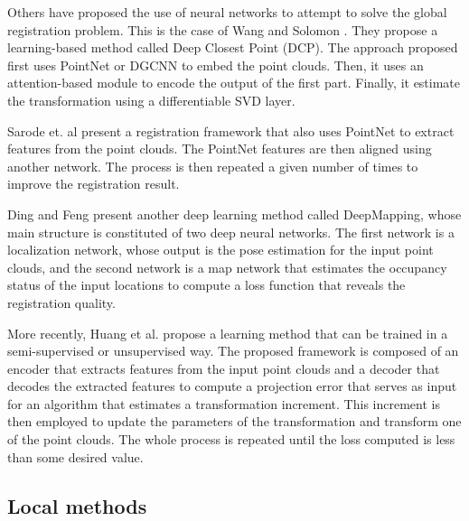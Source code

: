         Others have proposed the use of neural networks to attempt to solve the global registration problem.
        This is the case of Wang and Solomon \cite{Wang_2019_deepclosest}. They propose a learning-based method called Deep Closest Point (DCP).
        The approach proposed first uses PointNet \cite{Qi_2017_pointnetdeep} or DGCNN \cite{Wang_2019_dynamic} to embed the point clouds.
        Then, it uses an attention-based module to encode the output of the first part.
        Finally, it estimate the transformation using a differentiable SVD layer.

        Sarode et. al \cite{Sarode_2019_oneframework} present a registration framework that also uses PointNet to extract features from the point clouds.
        The PointNet features are then aligned using another network. The process is then repeated a given number of times to improve the registration result.
        
        Ding and Feng \cite{Ding_2019_deepmapping} present another deep learning method called DeepMapping,
        whose main structure is constituted of two deep neural networks.
        The first network is a localization network, whose output is the pose estimation for the input point clouds,
        and the second network is a map network that estimates the occupancy status of the input locations to compute a loss function that reveals
        the registration quality.

        More recently, Huang et al. \cite{Huang_2020_feature} propose a learning method that can be trained in a semi-supervised or unsupervised way.
        The proposed framework is composed of an encoder that extracts features from the input point clouds
        and a decoder that decodes the extracted features to compute a projection error that serves as input for an algorithm that estimates
        a transformation increment. 
        This increment is then employed to update the parameters of the transformation and transform one of the point clouds.
        The whole process is repeated until the loss computed is less than some desired value.

        \subsection{Local methods} 

